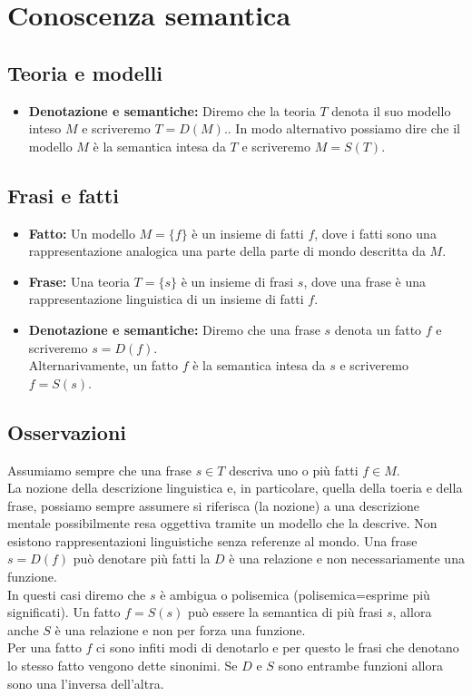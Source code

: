\documentclass[../main.tex]{subfiles}
\newcommand{\spazio}{\vspace{1em} \newline}
\begin{document}
    \section{Conoscenza semantica}
    \subsection{Teoria e modelli}
    \begin{itemize}
        \item \textbf{Denotazione e semantiche:} Diremo che la teoria $T$ denota il suo modello inteso $M$ e scriveremo $T=D(M)$..
            In modo alternativo possiamo dire che il modello $M$ è la semantica intesa da $T$ e scriveremo $M=S(T)$.
    \end{itemize}

    \subsection{Frasi e fatti}
    \begin{itemize}
        \item \textbf{Fatto:} Un modello $M=\{f\}$ è un insieme di fatti $f$, dove i fatti sono una rappresentazione analogica una parte della parte di mondo descritta da $M$.
        \item \textbf{Frase:} Una teoria $T=\{s\}$ è un insieme di frasi $s$, dove una frase è una rappresentazione linguistica di un insieme di fatti $f$.
        \item \textbf{Denotazione e semantiche:} Diremo che una frase $s$ denota un fatto $f$ e scriveremo $s=D(f)$.\\
            Alternarivamente, un fatto $f$ è la semantica intesa da $s$ e scriveremo $f=S(s)$.
    \end{itemize}

    \subsection{Osservazioni}
    Assumiamo sempre che una frase $s \in T$ descriva uno o più fatti $f \in M$.\\
    La nozione della descrizione linguistica e, in particolare, quella della toeria e della frase, possiamo sempre assumere si riferisca (la nozione) a una descrizione mentale possibilmente resa oggettiva tramite un modello che la descrive.
    \spazio
    Non esistono rappresentazioni linguistiche senza referenze al mondo.
    \spazio
    Una frase $s=D(f)$ può denotare più fatti la $D$ è una relazione e non necessariamente una funzione.\\
    In questi casi diremo che $s$ è ambigua o polisemica (polisemica=esprime più significati).
    \spazio
    Un fatto $f=S(s)$ può essere la semantica di più frasi $s$, allora anche $S$ è una relazione e non per forza una funzione.\\
    Per una fatto $f$ ci sono infiti modi di denotarlo e per questo le frasi che denotano lo stesso fatto vengono dette sinonimi.
    \spazio
    Se $D$ e $S$ sono entrambe funzioni allora sono una l'inversa dell'altra.
\end{document}
